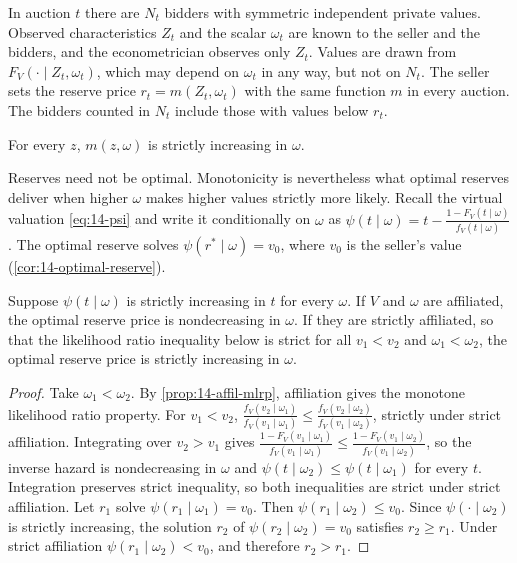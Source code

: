 In auction $t$ there are $N_t$ bidders with symmetric independent private values. Observed
characteristics $Z_t$ and the scalar $\omega_t$ are known to the seller and the bidders, and the
econometrician observes only $Z_t$. Values are drawn from $F_V(\cdot\mid Z_t,\omega_t)$, which may depend
on $\omega_t$ in any way, but not on $N_t$. The seller sets the reserve price $r_t=m(Z_t,\omega_t)$ with
the same function $m$ in every auction. The bidders counted in $N_t$ include those with values below
$r_t$.

\begin{assumption}\label{ass:15-roberts}
For every $z$, $m(z,\omega)$ is strictly increasing in $\omega$.
\end{assumption}

Reserves need not be optimal. Monotonicity is nevertheless what optimal reserves deliver when higher
$\omega$ makes higher values strictly more likely. Recall the virtual valuation \eqref{eq:14-psi} and write it conditionally on $\omega$ as
$\psi(t\mid\omega)=t-\frac{1-F_V(t\mid\omega)}{f_V(t\mid\omega)}$. The optimal reserve solves
$\psi(r^*\mid\omega)=v_0$, where $v_0$ is the seller's value (\cref{cor:14-optimal-reserve}).

\begin{proposition}\label{prop:15-roberts1}
Suppose $\psi(t\mid\omega)$ is strictly increasing in $t$ for every $\omega$. If $V$ and $\omega$ are
affiliated, the optimal reserve price is nondecreasing in $\omega$. If they are strictly affiliated, so that the
likelihood ratio inequality below is strict for all $v_1<v_2$ and $\omega_1<\omega_2$, the optimal reserve price
is strictly increasing in $\omega$.
\end{proposition}

\begin{proof}
Take $\omega_1<\omega_2$. By \cref{prop:14-affil-mlrp}, affiliation gives the monotone likelihood ratio
property. For $v_1<v_2$,
$\frac{f_V(v_2\mid\omega_1)}{f_V(v_1\mid\omega_1)}\le\frac{f_V(v_2\mid\omega_2)}{f_V(v_1\mid\omega_2)}$,
strictly under strict affiliation. Integrating over $v_2>v_1$ gives
$\frac{1-F_V(v_1\mid\omega_1)}{f_V(v_1\mid\omega_1)}\le\frac{1-F_V(v_1\mid\omega_2)}{f_V(v_1\mid\omega_2)}$,
so the inverse hazard is nondecreasing in $\omega$ and $\psi(t\mid\omega_2)\le\psi(t\mid\omega_1)$ for every $t$.
Integration preserves strict inequality, so both inequalities are strict under strict affiliation. Let $r_1$
solve $\psi(r_1\mid\omega_1)=v_0$. Then $\psi(r_1\mid\omega_2)\le v_0$. Since $\psi(\cdot\mid\omega_2)$ is
strictly increasing, the solution $r_2$ of $\psi(r_2\mid\omega_2)=v_0$ satisfies $r_2\ge r_1$. Under strict
affiliation $\psi(r_1\mid\omega_2)<v_0$, and therefore $r_2>r_1$.
\end{proof}

